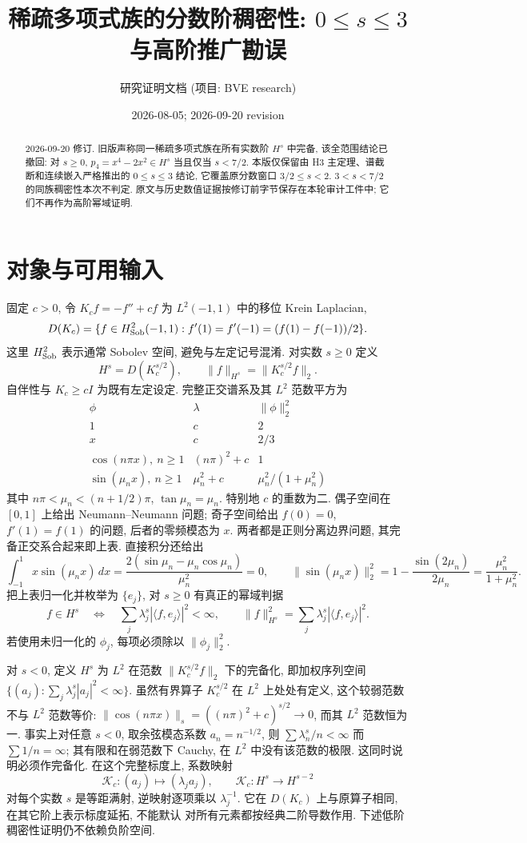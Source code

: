 \documentclass[UTF8]{ctexart}
\title{稀疏多项式族的分数阶稠密性: $0\le s\le3$ 与高阶推广勘误}
\author{研究证明文档 (项目: BVE research)}
\date{2026-08-05; 2026-09-20 revision}
\begin{document}
\maketitle

\begin{abstract}
2026-09-20 修订. 旧版声称同一稀疏多项式族在所有实数阶 $H^s$ 中完备,
该全范围结论已撤回: 对 $s\ge0$, $p_4=x^4-2x^2\in H^s$ 当且仅当 $s<7/2$.
本版仅保留由 H3 主定理、谱截断和连续嵌入严格推出的 $0\le s\le3$
结论, 它覆盖原分数窗口 $3/2\le s<2$. $3<s<7/2$ 的同族稠密性本次不判定.
原文与历史数值证据按修订前字节保存在本轮审计工件中; 它们不再作为高阶幂域证明.
\end{abstract}

\tableofcontents

\section{对象与可用输入}
固定 $c>0$, 令 $K_cf=-f''+cf$ 为 $L^2(-1,1)$ 中的移位 Krein Laplacian,
\[
 D(K_c)=\{f\in H^2_{\rm Sob}(-1,1):
 f'(1)=f'(-1)=(f(1)-f(-1))/2\}.
\]
这里 $H^2_{\rm Sob}$ 表示通常 Sobolev 空间, 避免与左定记号混淆.
对实数 $s\ge0$ 定义
\[
 H^s=D(K_c^{s/2}),\qquad \|f\|_{H^s}=\|K_c^{s/2}f\|_2.
\]
自伴性与 $K_c\ge cI$ 为既有左定设定. 完整正交谱系及其 $L^2$ 范数平方为
\[
\begin{array}{c|c|c}
 \phi & \lambda & \|\phi\|_2^2\\ \hline
 1 & c & 2\\
 x & c & 2/3\\
 \cos(n\pi x),\ n\ge1 & (n\pi)^2+c & 1\\
 \sin(\mu_nx),\ n\ge1 & \mu_n^2+c & \mu_n^2/(1+\mu_n^2)
\end{array}
\]
其中 $n\pi<\mu_n<(n+1/2)\pi$, $\tan\mu_n=\mu_n$.
特别地 $c$ 的重数为二. 偶子空间在 $[0,1]$ 上给出 Neumann--Neumann
问题; 奇子空间给出 $f(0)=0$, $f'(1)=f(1)$ 的问题, 后者的零频模态为 $x$.
两者都是正则分离边界问题, 其完备正交系合起来即上表. 直接积分还给出
\[
 \int_{-1}^1x\sin(\mu_nx)\,dx
 =\frac{2(\sin\mu_n-\mu_n\cos\mu_n)}{\mu_n^2}=0,\qquad
 \|\sin(\mu_nx)\|_2^2=1-\frac{\sin(2\mu_n)}{2\mu_n}
 =\frac{\mu_n^2}{1+\mu_n^2}.
\]
把上表归一化并枚举为 $\{e_j\}$, 对 $s\ge0$ 有真正的幂域判据
\[
 f\in H^s\quad\Longleftrightarrow\quad
 \sum_j\lambda_j^s|\langle f,e_j\rangle|^2<\infty,
 \qquad \|f\|_{H^s}^2=\sum_j\lambda_j^s|\langle f,e_j\rangle|^2.
\]
若使用未归一化的 $\phi_j$, 每项必须除以 $\|\phi_j\|_2^2$.

对 $s<0$, 定义 $H^s$ 为 $L^2$ 在范数 $\|K_c^{s/2}f\|_2$ 下的完备化,
即加权序列空间 $\{(a_j):\sum_j\lambda_j^s|a_j|^2<\infty\}$.
虽然有界算子 $K_c^{s/2}$ 在 $L^2$ 上处处有定义, 这个较弱范数不与
$L^2$ 范数等价: $\|\cos(n\pi x)\|_s=((n\pi)^2+c)^{s/2}\to0$,
而其 $L^2$ 范数恒为一. 事实上对任意 $s<0$, 取余弦模态系数
$a_n=n^{-1/2}$, 则 $\sum\lambda_n^s/n<\infty$ 而 $\sum1/n=\infty$;
其有限和在弱范数下 Cauchy, 在 $L^2$ 中没有该范数的极限.
这同时说明必须作完备化. 在这个完整标度上, 系数映射
\[
 \mathcal K_c:(a_j)\longmapsto(\lambda_ja_j),\qquad
 \mathcal K_c:H^s\longrightarrow H^{s-2}
\]
对每个实数 $s$ 是等距满射, 逆映射逐项乘以 $\lambda_j^{-1}$.
它在 $D(K_c)$ 上与原算子相同, 在其它阶上表示标度延拓, 不能默认
对所有元素都按经典二阶导数作用. 下述低阶稠密性证明仍不依赖负阶空间.
\end{document}
